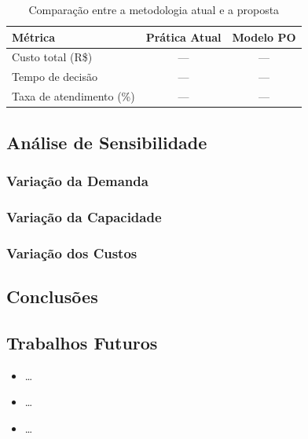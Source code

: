 \lipsum[3-4]

\begin{table}[H]
  \centering
  \caption{Comparação entre a metodologia atual e a proposta}
  \label{tab:comparacao_r3}
  \begin{tabular}{lcc}
    \toprule
    Métrica & Prática Atual & Modelo PO \\
    \midrule
    Custo total (R\$) & --- & --- \\
    Tempo de decisão  & --- & --- \\
    Taxa de atendimento (\%) & --- & --- \\
    \bottomrule
  \end{tabular}
\end{table}

\subsection{Análise de Sensibilidade}

\subsubsection{Variação da Demanda}
\lipsum[5]

\subsubsection{Variação da Capacidade}
\lipsum[6]

\subsubsection{Variação dos Custos}
\lipsum[7]


\subsection{Conclusões}
\lipsum[8]

\subsection{Trabalhos Futuros}

\begin{itemize}
  \item \ldots
  \item \ldots
  \item \ldots
\end{itemize}

\newpage
